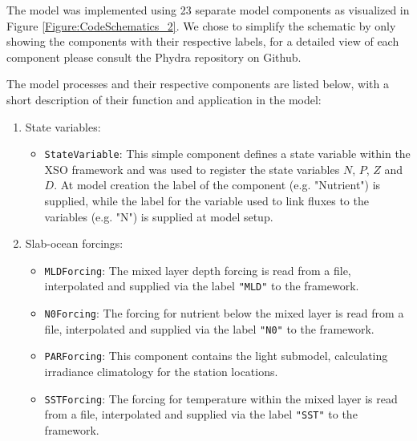 \documentclass[journal abbreviation, manuscript]{copernicus}
\begin{document}
The model was implemented using 23 separate model components as visualized in Figure \ref{Figure:CodeSchematics_2}. We chose to simplify the schematic by only showing the components with their respective labels, for a detailed view of each component please consult the Phydra repository on Github.

The model processes and their respective components are listed below, with a short description of their function and application in the model:

\begin{enumerate}
    \item State variables:
    \begin{itemize}
        \item \texttt{StateVariable}: This simple component defines a state variable within the XSO framework and was used to register the state variables $N$, $P$, $Z$ and $D$. At model creation the label of the component (e.g. "Nutrient") is supplied, while the label for the variable used to link fluxes to the variables (e.g. "N") is supplied at model setup.
    \end{itemize}
    
    \item Slab-ocean forcings:
    \begin{itemize}
        \item \texttt{MLDForcing}: The mixed layer depth forcing is read from a file, interpolated and supplied via the label \texttt{"MLD"} to the framework. 
        \item \texttt{N0Forcing}: The forcing for nutrient below the mixed layer is read from a file, interpolated and supplied via the label \texttt{"N0"} to the framework. 
        \item \texttt{PARForcing}: This component contains the light submodel, calculating irradiance climatology for the station locations.
        \item \texttt{SSTForcing}: The forcing for temperature within the mixed layer is read from a file, interpolated and supplied via the label \texttt{"SST"} to the framework.
    \end{itemize}
    

\end{enumerate}
\end{document}
